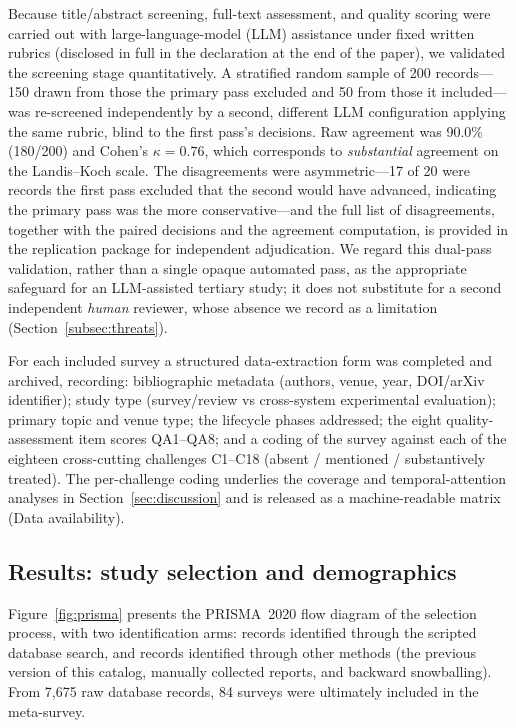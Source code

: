 \documentclass[a4paper,fleqn]{cas-sc}
\begin{document}
Because title/abstract screening, full-text assessment, and quality scoring were carried out with large-language-model (LLM) assistance under fixed written rubrics (disclosed in full in the declaration at the end of the paper), we validated the screening stage quantitatively. A stratified random sample of 200 records---150 drawn from those the primary pass excluded and 50 from those it included---was re-screened independently by a second, different LLM configuration applying the same rubric, blind to the first pass's decisions. Raw agreement was 90.0\% (180/200) and Cohen's $\kappa = 0.76$, which corresponds to \emph{substantial} agreement on the Landis--Koch scale. The disagreements were asymmetric---17 of 20 were records the first pass excluded that the second would have advanced, indicating the primary pass was the more conservative---and the full list of disagreements, together with the paired decisions and the agreement computation, is provided in the replication package for independent adjudication. We regard this dual-pass validation, rather than a single opaque automated pass, as the appropriate safeguard for an LLM-assisted tertiary study; it does not substitute for a second independent \emph{human} reviewer, whose absence we record as a limitation (Section~\ref{subsec:threats}).

For each included survey a structured data-extraction form was completed and archived, recording: bibliographic metadata (authors, venue, year, DOI/arXiv identifier); study type (survey/review vs cross-system experimental evaluation); primary topic and venue type; the lifecycle phases addressed; the eight quality-assessment item scores QA1--QA8; and a coding of the survey against each of the eighteen cross-cutting challenges C1--C18 (absent / mentioned / substantively treated). The per-challenge coding underlies the coverage and temporal-attention analyses in Section~\ref{sec:discussion} and is released as a machine-readable matrix (Data availability).

\subsection{Results: study selection and demographics}
\label{subsec:results}

Figure~\ref{fig:prisma} presents the PRISMA~2020 flow diagram of the selection process, with two identification arms: records identified through the scripted database search, and records identified through other methods (the previous version of this catalog, manually collected reports, and backward snowballing). From 7,675 raw database records, 84 surveys were ultimately included in the meta-survey.
\end{document}
